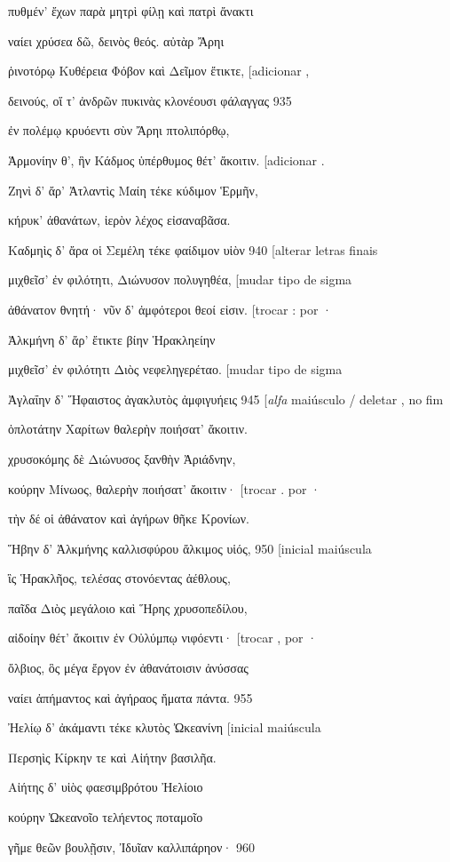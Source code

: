 πυθμέν' ἔχων παρὰ μητρὶ φίλῃ καὶ πατρὶ ἄνακτι

ναίει χρύσεα δῶ, δεινὸς θεός. αὐτὰρ Ἄρηι

ῥινοτόρῳ Κυθέρεια Φόβον καὶ Δεῖμον ἔτικτε, {[}adicionar ,

δεινούς, οἵ τ' ἀνδρῶν πυκινὰς κλονέουσι φάλαγγας 935

ἐν πολέμῳ κρυόεντι σὺν Ἄρηι πτολιπόρθῳ,

Ἁρμονίην θ', ἣν Κάδμος ὑπέρθυμος θέτ' ἄκοιτιν. {[}adicionar .

Ζηνὶ δ' ἄρ' Ἀτλαντὶς Μαίη τέκε κύδιμον Ἑρμῆν,

κήρυκ' ἀθανάτων, ἱερὸν λέχος εἰσαναβᾶσα.

Καδμηὶς δ' ἄρα οἱ Σεμέλη τέκε φαίδιμον υἱὸν 940 {[}alterar letras finais

μιχθεῖσ' ἐν φιλότητι, Διώνυσον πολυγηθέα, {[}mudar tipo de sigma

ἀθάνατον θνητή· νῦν δ' ἀμφότεροι θεοί εἰσιν. {[}trocar : por ·

Ἀλκμήνη δ' ἄρ' ἔτικτε βίην Ἡρακληείην

μιχθεῖσ' ἐν φιλότητι Διὸς νεφεληγερέταο. {[}mudar tipo de sigma

Ἀγλαΐην δ' Ἥφαιστος ἀγακλυτὸς ἀμφιγυήεις 945 {[}\emph{alfa} maiúsculo /
deletar , no fim

ὁπλοτάτην Χαρίτων θαλερὴν ποιήσατ' ἄκοιτιν.

χρυσοκόμης δὲ Διώνυσος ξανθὴν Ἀριάδνην,

κούρην Μίνωος, θαλερὴν ποιήσατ' ἄκοιτιν· {[}trocar . por ·

τὴν δέ οἱ ἀθάνατον καὶ ἀγήρων θῆκε Κρονίων.

Ἥβην δ' Ἀλκμήνης καλλισφύρου ἄλκιμος υἱός, 950 {[}inicial maiúscula

ἲς Ἡρακλῆος, τελέσας στονόεντας ἀέθλους,

παῖδα Διὸς μεγάλοιο καὶ Ἥρης χρυσοπεδίλου,

αἰδοίην θέτ' ἄκοιτιν ἐν Οὐλύμπῳ νιφόεντι· {[}trocar , por ·

ὄλβιος, ὃς μέγα ἔργον ἐν ἀθανάτοισιν ἀνύσσας

ναίει ἀπήμαντος καὶ ἀγήραος ἤματα πάντα. 955

Ἠελίῳ δ' ἀκάμαντι τέκε κλυτὸς Ὠκεανίνη {[}inicial maiúscula

Περσηὶς Κίρκην τε καὶ Αἰήτην βασιλῆα.

Αἰήτης δ' υἱὸς φαεσιμβρότου Ἠελίοιο

κούρην Ὠκεανοῖο τελήεντος ποταμοῖο

γῆμε θεῶν βουλῇσιν, Ἰδυῖαν καλλιπάρηον· 960

